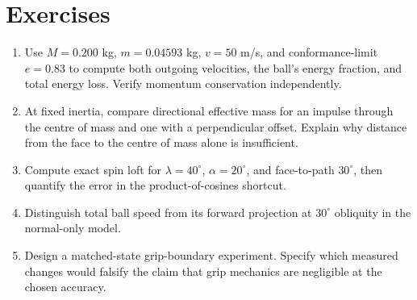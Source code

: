 \section{Exercises}
\begin{enumerate}
\item Use $M=0.200$ kg, $m=0.04593$ kg, $v=50$ m/s, and conformance-limit $e=0.83$ \citep{glossaryUSGAEquipment,club_design_cg} to compute
both outgoing velocities, the ball's energy fraction, and total energy loss.
Verify momentum conservation independently.
\item At fixed inertia, compare directional effective mass for an impulse
through the centre of mass and one with a perpendicular offset. Explain why
distance from the face to the centre of mass alone is insufficient.
\item Compute exact spin loft for $\lambda=40^\circ$, $\alpha=20^\circ$,
and face-to-path $30^\circ$, then quantify the error in the product-of-cosines shortcut.
\item Distinguish total ball speed from its forward projection at $30^\circ$
obliquity in the normal-only model.
\item Design a matched-state grip-boundary experiment. Specify which measured
changes would falsify the claim that grip mechanics are negligible at the chosen accuracy.
\end{enumerate}
